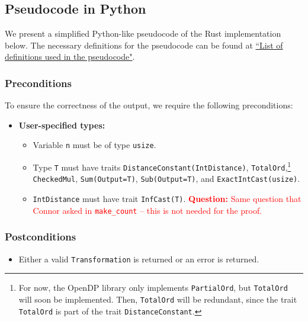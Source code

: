 \documentclass[11pt,a4paper]{article}
\theoremstyle{definition}
\newcommand{\questionc}[1]{\textcolor{red}{\textbf{Question:} #1}}
\begin{document}
\subsection{Pseudocode in Python}
We present a simplified Python-like pseudocode of the Rust implementation below. The necessary definitions for the pseudocode can be found at \href{https://www.overleaf.com/project/60d215bf90b337ac02200a99}{``List of definitions used in the pseudocode"}.

\subsubsection*{Preconditions}
To ensure the correctness of the output, we require the following preconditions:

\begin{itemize}
    \item \textbf{User-specified types:}
    \begin{itemize}
        \item Variable \texttt{n} must be of type \texttt{usize}.
        \item Type \texttt{T} must have traits \texttt{DistanceConstant(IntDistance)}, \texttt{TotalOrd},\footnote{For now, the OpenDP library only implements \texttt{PartialOrd}, but \texttt{TotalOrd} will soon be implemented. Then, \texttt{TotalOrd} will be redundant, since the trait \texttt{TotalOrd} is part of the trait \texttt{DistanceConstant}.} \texttt{CheckedMul}, \texttt{Sum(Output=T)}, \texttt{Sub(Output=T)},  and \texttt{ExactIntCast(usize)}.
        \item \texttt{IntDistance} must have trait \texttt{InfCast(T)}. \questionc{Same question that Connor asked in \texttt{make\_count} -- this is not needed for the proof.}
\end{itemize}
\end{itemize}

\subsubsection*{Postconditions}
\begin{itemize}
    \item Either a valid \texttt{Transformation} is returned or an error is returned.
\end{itemize}
\end{document}
